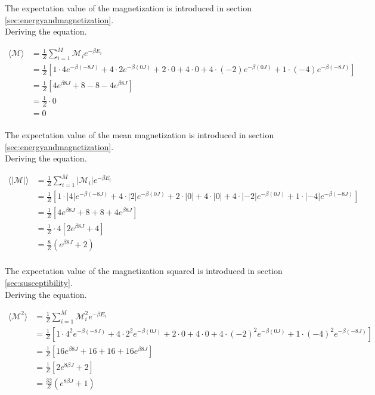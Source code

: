 \documentclass{article}
\begin{document}
The expectation value of the magnetization is introduced in section \ref{sec:energyandmagnetization}. \\

Deriving the equation.

\begin{align*}
  \langle \mathcal{M} \rangle &= \frac{1}{Z} \sum _{i=1} ^M \mathcal{M}_i e^{- \beta E_i} \\
  &= \frac{1}{Z} \left[1 \cdot 4 e^{- \beta (-8J)} + 4 \cdot 2 e^{- \beta (0J)} + 2 \cdot 0 + 4 \cdot 0 + 4 \cdot (-2)
  e^{- \beta (0J)} + 1 \cdot (-4) e^{- \beta (-8J)} \right] \\
  &= \frac{1}{Z} \left[ 4 e^{\beta 8J} + 8 - 8 - 4 e^{ \beta 8J} \right] \\
  &= \frac{1}{Z} \cdot 0 \\
  &= 0
\end{align*} \\

The expectation value of the mean magnetization is introduced in section \ref{sec:energyandmagnetization}. \\

Deriving the equation.

\begin{align*}
    \langle | \mathcal{M} | \rangle &= \frac{1}{Z} \sum _{i=1} ^M |\mathcal{M}_i| e^{- \beta E_i} \\
    &= \frac{1}{Z} \left[1 \cdot |4| e^{- \beta (-8J)} + 4 \cdot |2| e^{- \beta (0J)} + 2 \cdot |0| + 4 \cdot |0| + 4 \cdot |-2|
    e^{- \beta (0J)} + 1 \cdot |-4| e^{- \beta (-8J)} \right] \\
    &= \frac{1}{Z} \left[ 4 e^{\beta 8J} + 8 + 8 + 4 e^{ \beta 8J} \right] \\
    &= \frac{1}{Z} \cdot 4 \left[ 2 e^{\beta 8J} + 4 \right] \\
    &= \frac{8}{Z} \left( e^{\beta 8J} + 2 \right) \\
\end{align*}

The expectation value of the magnetization squared is introduced in section \ref{sec:susceptibility}. \\

Deriving the equation.

\begin{align*}
  \langle \mathcal{M}^2 \rangle &= \frac{1}{Z} \sum _{i=1} ^M \mathcal{M}_i^2 e^{- \beta E_i} \\
  &= \frac{1}{Z} \left[1 \cdot 4^2 e^{- \beta (-8J)} + 4 \cdot 2^2 e^{- \beta (0J)} + 2 \cdot 0 + 4 \cdot 0 + 4 \cdot (-2)^2 e^{- \beta (0J)} + 1 \cdot (-4)^2 e^{- \beta (-8J)} \right] \\
  &= \frac{1}{Z} \left[ 16 e^{\beta 8J} + 16 + 16 + 16 e^{ \beta 8J} \right] \\
  &= \frac{1}{Z} \left[ 2 e^{8 \beta J} + 2 \right] \\
  &= \frac{32}{Z} \left( e^{8 \beta J} + 1 \right) \\
\end{align*}
\end{document}
